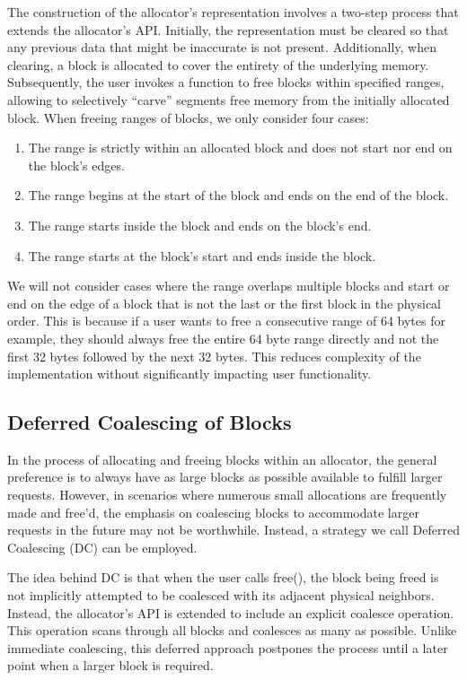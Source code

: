 The construction of the allocator's representation involves a two-step process that extends the allocator's API. Initially, the representation must be cleared so that any previous data that might be inaccurate is not present. Additionally, when clearing, a block is allocated to cover the entirety of the underlying memory. Subsequently, the user invokes a function to free blocks within specified ranges, allowing to selectively ``carve'' segments free memory from the initially allocated block. When freeing ranges of blocks, we only consider four cases: 

\begin{enumerate}
    \item The range is strictly within an allocated block and does not start nor end on the block's edges.
    \item The range begins at the start of the block and ends on the end of the block.
    \item The range starts inside the block and ends on the block's end.
    \item The range starts at the block's start and ends inside the block.
\end{enumerate}

We will not consider cases where the range overlaps multiple blocks and start or end on the edge of a block that is not the last or the first block in the physical order. This is because if a user wants to free a consecutive range of 64 bytes for example, they should always free the entire 64 byte range directly and not the first 32 bytes followed by the next 32 bytes. This reduces complexity of the implementation without significantly impacting user functionality.

\subsection{Deferred Coalescing of Blocks}

In the process of allocating and freeing blocks within an allocator, the general preference is to always have as large blocks as possible available to fulfill larger requests. However, in scenarios where numerous small allocations are frequently made and free'd, the emphasis on coalescing blocks to accommodate larger requests in the future may not be worthwhile. Instead, a strategy we call Deferred Coalescing (DC) can be employed.

The idea behind DC is that when the user calls free(), the block being freed is not implicitly attempted to be coalesced with its adjacent physical neighbors. Instead, the allocator's API is extended to include an explicit coalesce operation. This operation scans through all blocks and coalesces as many as possible. Unlike immediate coalescing, this deferred approach postpones the process until a later point when a larger block is required.

